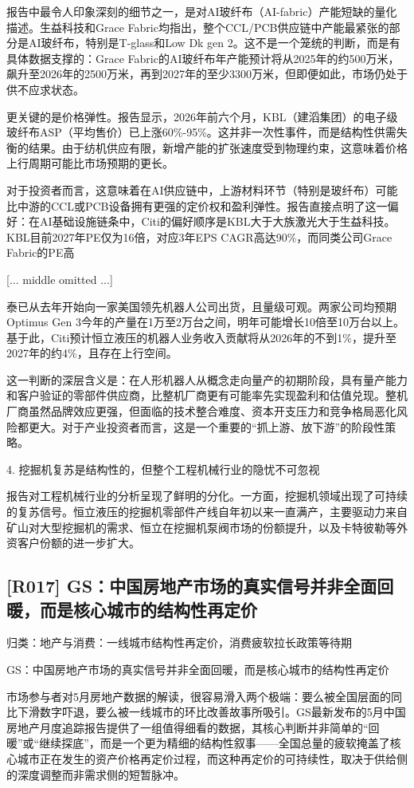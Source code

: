 \documentclass[11pt]{ctexart}
\begin{document}
报告中最令人印象深刻的细节之一，是对AI玻纤布（AI-fabric）产能短缺的量化描述。生益科技和Grace Fabric均指出，整个CCL/PCB供应链中产能最紧张的部分是AI玻纤布，特别是T-glass和Low Dk gen 2。这不是一个笼统的判断，而是有具体数据支撑的：Grace Fabric的AI玻纤布年产能预计将从2025年的约500万米，飙升至2026年的2500万米，再到2027年的至少3300万米，但即便如此，市场仍处于供不应求状态。

更关键的是价格弹性。报告显示，2026年前六个月，KBL（建滔集团）的电子级玻纤布ASP（平均售价）已上涨60\%-95\%。这并非一次性事件，而是结构性供需失衡的结果。由于纺机供应有限，新增产能的扩张速度受到物理约束，这意味着价格上行周期可能比市场预期的更长。

对于投资者而言，这意味着在AI供应链中，上游材料环节（特别是玻纤布）可能比中游的CCL或PCB设备拥有更强的定价权和盈利弹性。报告直接点明了这一偏好：在AI基础设施链条中，Citi的偏好顺序是KBL大于大族激光大于生益科技。KBL目前2027年PE仅为16倍，对应3年EPS CAGR高达90\%，而同类公司Grace Fabric的PE高

[... middle omitted ...]

泰已从去年开始向一家美国领先机器人公司出货，且量级可观。两家公司均预期Optimus Gen 3今年的产量在1万至2万台之间，明年可能增长10倍至10万台以上。基于此，Citi预计恒立液压的机器人业务收入贡献将从2026年的不到1\%，提升至2027年的约4\%，且存在上行空间。

这一判断的深层含义是：在人形机器人从概念走向量产的初期阶段，具有量产能力和客户验证的零部件供应商，比整机厂商更有可能率先实现盈利和估值兑现。整机厂商虽然品牌效应更强，但面临的技术整合难度、资本开支压力和竞争格局恶化风险都更大。对于产业投资者而言，这是一个重要的“抓上游、放下游”的阶段性策略。

4. 挖掘机复苏是结构性的，但整个工程机械行业的隐忧不可忽视

报告对工程机械行业的分析呈现了鲜明的分化。一方面，挖掘机领域出现了可持续的复苏信号。恒立液压的挖掘机零部件产线自年初以来一直满产，主要驱动力来自矿山对大型挖掘机的需求、恒立在挖掘机泵阀市场的份额提升，以及卡特彼勒等外资客户份额的进一步扩大。

\subsection{[R017] GS：中国房地产市场的真实信号并非全面回暖，而是核心城市的结构性再定价}
{\small\color{refgray}归类：地产与消费：一线城市结构性再定价，消费疲软拉长政策等待期}

GS：中国房地产市场的真实信号并非全面回暖，而是核心城市的结构性再定价

市场参与者对5月房地产数据的解读，很容易滑入两个极端：要么被全国层面的同比下滑数字吓退，要么被一线城市的环比改善故事所吸引。GS最新发布的5月中国房地产月度追踪报告提供了一组值得细看的数据，其核心判断并非简单的“回暖”或“继续探底”，而是一个更为精细的结构性叙事——全国总量的疲软掩盖了核心城市正在发生的资产价格再定价过程，而这种再定价的可持续性，取决于供给侧的深度调整而非需求侧的短暂脉冲。
\end{document}
